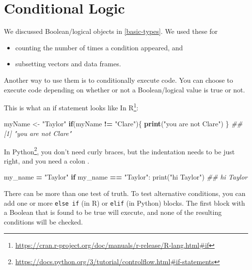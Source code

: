 \documentclass[12pt,krantz2]{krantz}
\makeatletter
\newenvironment{Shaded}{\begin{snugshade}}{\end{snugshade}}
\newcommand{\BuiltInTok}[1]{#1}
\newcommand{\CommentTok}[1]{\textcolor[rgb]{0.37,0.37,0.37}{\textit{#1}}}
\newcommand{\ControlFlowTok}[1]{\textcolor[rgb]{0.27,0.27,0.27}{\textbf{#1}}}
\newcommand{\KeywordTok}[1]{\textcolor[rgb]{0.27,0.27,0.27}{\textbf{#1}}}
\newcommand{\NormalTok}[1]{#1}
\newcommand{\OperatorTok}[1]{\textcolor[rgb]{0.43,0.43,0.43}{\textbf{#1}}}
\newcommand{\StringTok}[1]{\textcolor[rgb]{0.5,0.5,0.5}{#1}}
\providecommand{\tightlist}{%
  \setlength{\itemsep}{0pt}\setlength{\parskip}{0pt}}
\renewcommand{\href}[2]{#2\footnote{\url{#1}}}
\newenvironment{kframe}{%
\medskip{}
\setlength{\fboxsep}{.8em}
 \def\at@end@of@kframe{}%
 \ifinner\ifhmode%
  \def\at@end@of@kframe{\end{minipage}}%
  \begin{minipage}{\columnwidth}%
 \fi\fi%
 \def\FrameCommand##1{\hskip\@totalleftmargin \hskip-\fboxsep
 \colorbox{shadecolor}{##1}\hskip-\fboxsep
     \hskip-\linewidth \hskip-\@totalleftmargin \hskip\columnwidth}%
 \MakeFramed {\advance\hsize-\width
   \@totalleftmargin\z@ \linewidth\hsize
   \@setminipage}}%
 {\par\unskip\endMakeFramed%
 \at@end@of@kframe}
\renewenvironment{Shaded}{\begin{kframe}}{\end{kframe}}
\makeatother
\begin{document}
\hypertarget{conditional-logic}{%
\section{Conditional Logic}\label{conditional-logic}}

We discussed Boolean/logical objects in \ref{basic-types}. We used these for

\begin{itemize}
\tightlist
\item
  counting the number of times a condition appeared, and
\item
  subsetting vectors and data frames.
\end{itemize}

Another way to use them is to conditionally execute code. You can choose to execute code depending on whether or not a Boolean/logical value is true or not.

This is what an \href{https://cran.r-project.org/doc/manuals/r-release/R-lang.html\#if}{if statement looks like In R}:

\begin{Shaded}
\begin{Highlighting}[]
\NormalTok{myName <-}\StringTok{ "Taylor"}
\ControlFlowTok{if}\NormalTok{(myName }\OperatorTok{!=}\StringTok{ "Clare"}\NormalTok{)\{}
  \KeywordTok{print}\NormalTok{(}\StringTok{"you are not Clare"}\NormalTok{)}
\NormalTok{\}}
\CommentTok{## [1] "you are not Clare"}
\end{Highlighting}
\end{Shaded}

\href{https://docs.python.org/3/tutorial/controlflow.html\#if-statements}{In Python}, you don't need curly braces, but the indentation needs to be just right, and you need a colon \citep{Lutz13}.

\begin{Shaded}
\begin{Highlighting}[]
\NormalTok{my_name }\OperatorTok{=} \StringTok{"Taylor"}
\ControlFlowTok{if}\NormalTok{ my_name }\OperatorTok{==} \StringTok{"Taylor"}\NormalTok{:}
    \BuiltInTok{print}\NormalTok{(}\StringTok{"hi Taylor"}\NormalTok{)}
\CommentTok{## hi Taylor}
\end{Highlighting}
\end{Shaded}

There can be more than one test of truth. To test alternative conditions, you can add one or more \texttt{else\ if} (in R) or \texttt{elif} (in Python) blocks. The first block with a Boolean that is found to be true will execute, and none of the resulting conditions will be checked.
\end{document}

